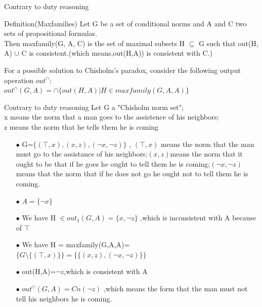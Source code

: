 \documentclass{beamer}
\begin{document}
\begin{frame}{Contrary to duty reasoning}
\begin{block}{Definition(Maxfamilies)}
Let G be a set of conditional norms and A and C two sets of propositional formulas.\\
Then maxfamily(G, A, C) is the set of maximal
subsets H $\subseteq$ G such that out(H, A) $\cup$ C is consistent.(which means,out(H,A)) is consistent with C.)\\

\end{block}
For a possible solution to Chisholm’s paradox, consider the following output operation $out^{\cap}$:\\
$out^{\cap}(G, A) = \cap
\{out(H, A) | H \in maxfamily(G, A, A)\}
$
    
\end{frame}
\begin{frame}{Contrary to duty reasoning}
Let G a "Chisholm norm set";\\
x means the norm that a man goes to the assistence of his neighbors;\\
z means the norm that he tells them he is coming\\
\begin{enumerate}
\item[$\bullet$]G=$\{(\top ,x),(x,z),(\neg x,\neg z)  \}$
 , $(\top ,x)$ means the norm that the man must go to the assistance of his neighbors;$(x,z)$means the norm that it ought to be that if he goes he ought to tell them he is coming;$(\neg x,\neg z)$ means that the norm that if he does not go he ought not to tell them he is coming.
 \item[$\bullet$] $A=\{ \neg x \}$
 \item[$\bullet$] We have H $\in out_{1}(G,A)=\{x,\neg z\}$ ,which is inconsistent with A because of $\top$
 \item[$\bullet$] We have  H = maxfamily(G,A,A)=$ \{ G\setminus \{(\top,x) \}\}=\{\{(x,z),(\neg x,\neg z)   \}\} $
 \item[$\bullet$] out(H,A)=$\neg z$,which is consistent with A
 \item[$\bullet$]$out^{\cap}(G,A)=Cn(\neg z)$ ,which means the form that the man must not tell his neighbors he is coming.
\end{enumerate}
\end{frame}
\end{document}
